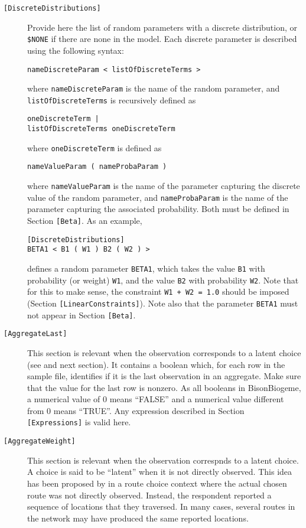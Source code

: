 \documentclass[12pt,a4paper]{article}
\newcommand{\specitem}[1]{\texttt{[#1]}}
\newcommand{\BBIOGEME}{BisonBiogeme}
\begin{document}
\begin{description}
\item[\specitem{DiscreteDistributions}] Provide here the list of random parameters with a discrete distribution, or \verb+$NONE+ if there are none in the model. Each discrete parameter is described using the following syntax:
\begin{verbatim}
nameDiscreteParam < listOfDiscreteTerms >
\end{verbatim} 
where \verb+nameDiscreteParam+ is the name of the random parameter, and 
  \verb+listOfDiscreteTerms+ is recursively defined as
\begin{verbatim}
oneDiscreteTerm |
listOfDiscreteTerms oneDiscreteTerm
\end{verbatim}
where \verb+oneDiscreteTerm+ is defined as 
\begin{verbatim}
nameValueParam ( nameProbaParam )
\end{verbatim}
where \verb+nameValueParam+ is the name of the parameter capturing the discrete value of the random parameter, and \verb+nameProbaParam+ is the name of the parameter capturing the associated probability. Both must be defined in Section \verb+[Beta]+. As an example,
\begin{verbatim}
[DiscreteDistributions]
BETA1 < B1 ( W1 ) B2 ( W2 ) >
\end{verbatim}
defines a random parameter \verb+BETA1+, which takes the value \verb+B1+ with probability (or weight) \verb+W1+, and the value \verb+B2+ with probability \verb+W2+. Note that for this to make sense, the constraint \verb-W1 + W2 = 1.0- should be imposed (Section \verb+[LinearConstraints]+). Note also that the parameter \verb+BETA1+ must not appear in Section \verb+[Beta]+.

\item[\specitem{AggregateLast}] 
This section is relevant when the observation corresponds to a latent choice
 (see \cite{BierFrej07} and next section). It contains a
boolean which, for each row in the sample file,   identifies if it is the last observation in an aggregate. Make sure that the value for the last row is nonzero. As all booleans in \BBIOGEME, a numerical value of 0 means ``FALSE'' and a numerical value different from 0 means ``TRUE''. 
 Any expression  described in Section \verb+[Expressions]+ is valid here.

\item[\specitem{AggregateWeight}]
This section is relevant when the observation correspnds to a latent
choice.
A choice is said to be ``latent'' when it is not directly observed.
This idea has been proposed by  in a route
choice context where the actual chosen route was not directly
observed. Instead, the respondent reported a sequence of locations
that they traversed. In many cases, several  routes in the
network may have produced the same reported locations. 


\end{description}
\end{document}
